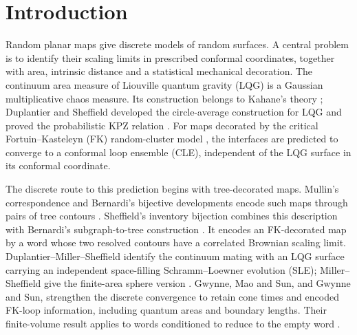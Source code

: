\section{Introduction}\label{intro:section}

Random planar maps give discrete models of random surfaces. A central
problem is to identify their scaling limits in prescribed conformal
coordinates, together with area, intrinsic distance and a statistical
mechanical decoration. The continuum area measure of Liouville quantum
gravity (LQG) is a Gaussian multiplicative chaos measure. Its construction
belongs to Kahane's theory \citep{KahaneChaos1985}; Duplantier and
Sheffield developed the circle-average construction for LQG and proved
the probabilistic KPZ relation \citep{DuplantierSheffieldKPZ2011}.
For maps decorated by the critical Fortuin--Kasteleyn (FK)
random-cluster model \citep{FortuinKasteleyn1972}, the interfaces are
predicted to converge to a conformal loop ensemble (CLE), independent
of the LQG surface in its conformal coordinate.

The discrete route to this prediction begins with tree-decorated maps.
Mullin's correspondence and Bernardi's bijective developments encode
such maps through pairs of tree contours
\citep{Mullin1967,Bernardi2007}. Sheffield's inventory bijection combines
this description with Bernardi's subgraph-to-tree construction
\citep{Bernardi2008Subgraphs,SheffieldInventory}. It encodes an
FK-decorated map by a word whose two resolved contours have a correlated
Brownian scaling limit. Duplantier--Miller--Sheffield identify the
continuum mating with an LQG surface carrying an independent
space-filling Schramm--Loewner evolution (SLE); Miller--Sheffield give
the finite-area sphere version \citep{DMSMating,MillerSheffieldSphere}.
Gwynne, Mao and Sun, and Gwynne and Sun, strengthen the discrete
convergence to retain cone times and encoded FK-loop information,
including quantum areas and boundary lengths. Their finite-volume
result applies to words conditioned to reduce to the empty word
\citep{GwynneMaoSunFKI,GwynneSunFKII,GwynneSunFKIII}.

